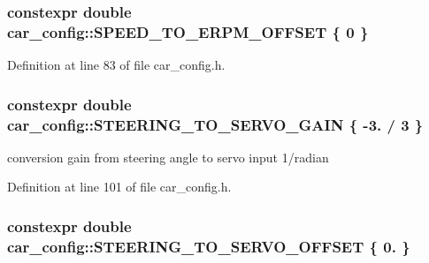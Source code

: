 \subsubsection[{\texorpdfstring{S\+P\+E\+E\+D\+\_\+\+T\+O\+\_\+\+E\+R\+P\+M\+\_\+\+O\+F\+F\+S\+ET}{SPEED_TO_ERPM_OFFSET}}]{\setlength{\rightskip}{0pt plus 5cm}constexpr double car\+\_\+config\+::\+S\+P\+E\+E\+D\+\_\+\+T\+O\+\_\+\+E\+R\+P\+M\+\_\+\+O\+F\+F\+S\+ET \{ 0 \}}\hypertarget{namespacecar__config_a7f7bf8deb89d8360f3c07f9f9a0c7faf}{}\label{namespacecar__config_a7f7bf8deb89d8360f3c07f9f9a0c7faf}






Definition at line 83 of file car\+\_\+config.\+h.

\subsubsection[{\texorpdfstring{S\+T\+E\+E\+R\+I\+N\+G\+\_\+\+T\+O\+\_\+\+S\+E\+R\+V\+O\+\_\+\+G\+A\+IN}{STEERING_TO_SERVO_GAIN}}]{\setlength{\rightskip}{0pt plus 5cm}constexpr double car\+\_\+config\+::\+S\+T\+E\+E\+R\+I\+N\+G\+\_\+\+T\+O\+\_\+\+S\+E\+R\+V\+O\+\_\+\+G\+A\+IN \{ -\/3. / 3 \}}\hypertarget{namespacecar__config_aa8ab85fe7b8ab728f34d15028f114d86}{}\label{namespacecar__config_aa8ab85fe7b8ab728f34d15028f114d86}


conversion gain from steering angle to servo input  1/radian 



Definition at line 101 of file car\+\_\+config.\+h.

\subsubsection[{\texorpdfstring{S\+T\+E\+E\+R\+I\+N\+G\+\_\+\+T\+O\+\_\+\+S\+E\+R\+V\+O\+\_\+\+O\+F\+F\+S\+ET}{STEERING_TO_SERVO_OFFSET}}]{\setlength{\rightskip}{0pt plus 5cm}constexpr double car\+\_\+config\+::\+S\+T\+E\+E\+R\+I\+N\+G\+\_\+\+T\+O\+\_\+\+S\+E\+R\+V\+O\+\_\+\+O\+F\+F\+S\+ET \{ 0. \}}\hypertarget{namespacecar__config_abb6ef746663276219b321683dfbb8896}{}\label{namespacecar__config_abb6ef746663276219b321683dfbb8896}


